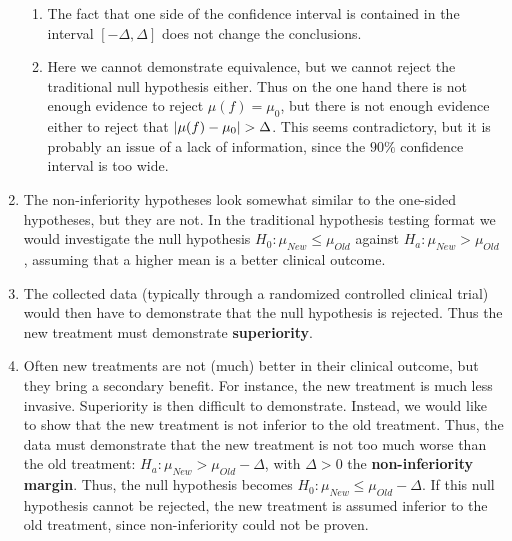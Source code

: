 \begin{enumerate}
\begin{enumerate}
        \item The fact that one side of the confidence interval is contained in the interval $[-\Delta, \Delta]$ does not change the conclusions.
        \hfill \cite{statistics/book/Statistics-for-Data-Scientists/Maurits-Kaptein}

        \item Here we cannot demonstrate equivalence, but we cannot reject the traditional null hypothesis either. 
        Thus on the one hand there is not enough evidence to reject $\mu( f ) = \mu_0 $, but there is not enough evidence either to reject that $\left| \mu( f ) - \mu_0 \right| > \Delta$.
        This seems contradictory, but it is probably an issue of a lack of information, since the $90\%$ confidence interval is too wide.
        \hfill \cite{statistics/book/Statistics-for-Data-Scientists/Maurits-Kaptein}
    \end{enumerate}

    \item The non-inferiority hypotheses look somewhat similar to the one-sided hypotheses, but they are not.
    In the traditional hypothesis testing format we would investigate the null hypothesis $H_0 : \mu_{N ew} \leq \mu_{Old}$ against $H_a : \mu_{N ew} > \mu_{Old}$ , assuming that a higher mean is a better clinical outcome.
    \hfill \cite{statistics/book/Statistics-for-Data-Scientists/Maurits-Kaptein}

    \item The collected data (typically through a randomized controlled clinical trial) would then have to demonstrate that the null hypothesis is rejected. 
    Thus the new treatment must demonstrate \textbf{superiority}. 
    \hfill \cite{statistics/book/Statistics-for-Data-Scientists/Maurits-Kaptein}

    \item Often new treatments are not (much) better in their clinical outcome, but they bring a secondary benefit. 
    For instance, the new treatment is much less invasive. 
    Superiority is then difficult to demonstrate. 
    Instead, we would like to show that the new treatment is not inferior to the old treatment. 
    Thus, the data must demonstrate that the new treatment is not too much worse than the old treatment: $H_a : \mu_{N ew} > \mu_{Old} - \Delta$, with $\Delta > 0$ the \textbf{non-inferiority margin}. 
    Thus, the null hypothesis becomes $H_0 : \mu_{N ew} \leq \mu_{Old} - \Delta$. 
    If this null hypothesis cannot be rejected, the new treatment is assumed inferior to the old treatment, since non-inferiority could not be proven.
    \hfill \cite{statistics/book/Statistics-for-Data-Scientists/Maurits-Kaptein}
\end{enumerate}

















